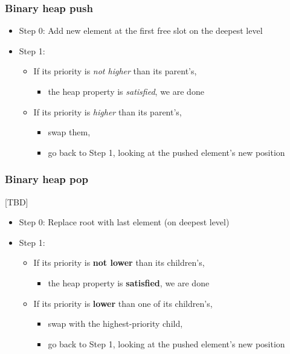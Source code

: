 \documentclass[12pt]{article}
\begin{document}
\subsubsection{Binary heap push}

\begin{itemize}
  \item Step 0: Add new element at the first free slot on the deepest level
  \item Step 1:
  \begin{itemize}
    \item If its priority is \textit{not higher} than its parent's,
    \begin{itemize}
      \item the heap property is \textit{satisfied}, we are done
    \end{itemize}
    \item If its priority is \textit{higher} than its parent's,
    \begin{itemize}
      \item swap them,
      \item go back to Step 1, looking at the pushed element's new position
    \end{itemize}
  \end{itemize}
\end{itemize}


\subsubsection{Binary heap pop}

[TBD]

\begin{itemize}
    \item Step 0: Replace root with last element (on deepest level)
    \item Step 1:
    \begin{itemize}
        \item If its priority is \textbf{not lower} than its children’s,
        \begin{itemize}
            \item the heap property is \textbf{satisfied}, we are done
        \end{itemize}
        \item If its priority is \textbf{lower} than one of its children’s,
        \begin{itemize}
            \item swap with the highest-priority child,
            \item go back to Step 1, looking at the pushed element’s new position
        \end{itemize}
    \end{itemize}
\end{itemize}
\end{document}
